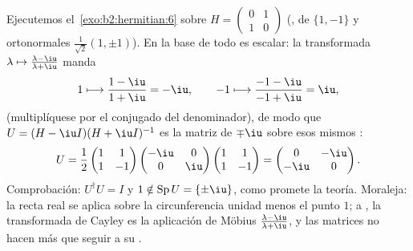 \begin{example}\label{ex:b2:hermitian:cayleyrun}
Ejecutemos el~\cref{exo:b2:hermitian:6} sobre $H = \begin{pmatrix} 0
& 1\\ 1 & 0\end{pmatrix}$ (, de  $\{1, -1\}$ y
 ortonormales $\frac{1}{\sqrt2}(1, \pm1)$). En la base
de  todo es escalar: la transformada $\lambda \mapsto
\frac{\lambda - \iu}{\lambda + \iu}$ manda
\[
1 \longmapsto \frac{1 - \iu}{1 + \iu} = -\iu,
\qquad
-1 \longmapsto \frac{-1 - \iu}{-1 + \iu} = \iu ,
\]
(multiplíquese por el conjugado del denominador), de modo que $U = (H
- \iu I)(H + \iu I)^{-1}$ es la matriz  de
 $\mp\iu$ sobre esos mismos :
\[
U = \frac{1}{2}\begin{pmatrix} 1 & 1\\ 1 & -1\end{pmatrix}
\begin{pmatrix} -\iu & 0\\ 0 & \iu\end{pmatrix}
\begin{pmatrix} 1 & 1\\ 1 & -1\end{pmatrix}
= \begin{pmatrix} 0 & -\iu\\ -\iu & 0\end{pmatrix} .
\]
Comprobación: $U^\dagger U = I$ y $1 \notin \operatorname{Sp}U =
\{\pm\iu\}$, como promete la teoría. Moraleja: la recta real se
aplica sobre la circunferencia unidad menos el punto $1$;
 a , la transformada de Cayley es la
aplicación de Möbius $\frac{\lambda-\iu}{\lambda+\iu}$, y las
matrices no hacen más que seguir a su .
\end{example}

